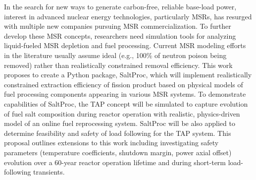In the search for new ways to generate carbon-free, reliable 
base-load power, interest in advanced nuclear energy technologies, 
particularly \glspl{MSR}, has resurged with multiple new companies 
pursuing \gls{MSR} commercialization. To further develop these \gls{MSR} 
concepts, researchers need simulation tools for analyzing liquid-fueled 
\gls{MSR} depletion and fuel processing. Current \gls{MSR} modeling efforts in 
the literature usually assume ideal (e.g., 100\% of neutron poison being 
removed) rather than realistically constrained removal efficiency. This work 
proposes to create a Python package, SaltProc, which will implement 
realistically constrained extraction efficiency of fission product based on 
physical models of fuel processing components appearing in various \gls{MSR} 
systems. To demonstrate capabilities of SaltProc, the \gls{TAP} concept will 
be simulated to capture evolution of fuel salt composition during reactor 
operation with realistic, physics-driven model of an online fuel reprocessing 
system. SaltProc will be also applied to determine feasibility and safety of 
load following for the \gls{TAP} system. This proposal outlines extensions to 
this work including investigating safety parameters (temperature coefficients, 
shutdown margin, power axial offset) evolution over a 60-year reactor 
operation lifetime and during short-term load-following transients.



